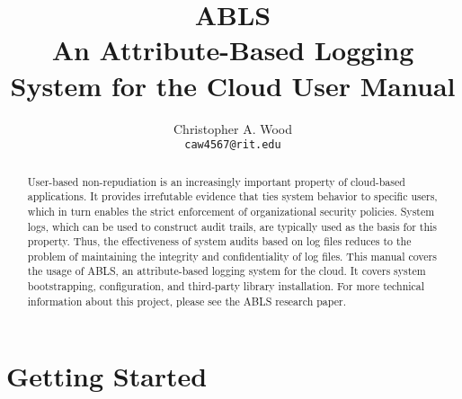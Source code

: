 \documentclass[a4paper,11pt]{report}
\begin{document}
\title{\textbf{ABLS} \\ An Attribute-Based Logging System for the Cloud {\small User Manual}}
\author{Christopher A. Wood \\ {\tt caw4567@rit.edu}}
\maketitle
\begin{abstract}\centering
User-based non-repudiation is an increasingly important property of cloud-based applications. It provides irrefutable evidence that ties system behavior to specific users, which in turn enables the strict enforcement of organizational security policies. System logs, which can be used to construct audit trails, are typically used as the basis for this property. Thus, the effectiveness of system audits based on log files reduces to the problem of maintaining the integrity and confidentiality of log files. This manual covers the usage of ABLS, an attribute-based logging system for the cloud. It covers system bootstrapping, configuration, and third-party library installation. For more technical information about this project, please see the ABLS research paper. 
\end{abstract}
\tableofcontents
\chapter{Getting Started}


{}

\end{document}
